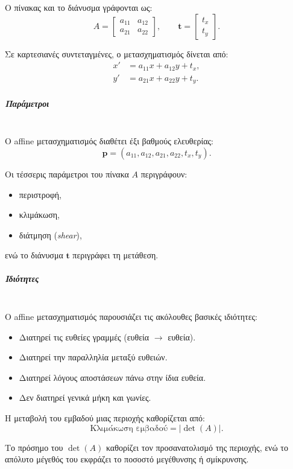 \documentclass[12pt]{article}
\begin{document}
Ο πίνακας και το διάνυσμα γράφονται ως:
\[
A =
\begin{bmatrix}
a_{11} & a_{12} \\
a_{21} & a_{22}
\end{bmatrix},
\qquad
\mathbf{t} =
\begin{bmatrix}
t_x \\
t_y
\end{bmatrix}.
\]

Σε καρτεσιανές συντεταγμένες, ο μετασχηματισμός δίνεται από:
\[
\begin{aligned}
x' &= a_{11}x + a_{12}y + t_x, \\
y' &= a_{21}x + a_{22}y + t_y.
\end{aligned}
\]

\subparagraph{Παράμετροι}
\mbox{}\\
Ο affine μετασχηματισμός διαθέτει έξι βαθμούς ελευθερίας:
\[
\mathbf{p} = (a_{11}, a_{12}, a_{21}, a_{22}, t_x, t_y).
\]

Οι τέσσερις παράμετροι του πίνακα \(A\) περιγράφουν:
\begin{itemize}
    \item περιστροφή,
    \item κλιμάκωση,
    \item διάτμηση (\textit{shear}),
\end{itemize}
ενώ το διάνυσμα \(\mathbf{t}\) περιγράφει τη μετάθεση.

\subparagraph{Ιδιότητες}
\mbox{}\\
Ο affine μετασχηματισμός παρουσιάζει τις ακόλουθες βασικές ιδιότητες:
\begin{itemize}
    \item Διατηρεί τις ευθείες γραμμές (ευθεία \(\rightarrow\) ευθεία).
    \item Διατηρεί την παραλληλία μεταξύ ευθειών.
    \item Διατηρεί λόγους αποστάσεων πάνω στην ίδια ευθεία.
    \item Δεν διατηρεί γενικά μήκη και γωνίες.
\end{itemize}

Η μεταβολή του εμβαδού μιας περιοχής καθορίζεται από:
\[
\text{Κλιμάκωση εμβαδού} = \left| \det(A) \right|.
\]

Το πρόσημο του \(\det(A)\) καθορίζει τον προσανατολισμό της περιοχής, ενώ το απόλυτο μέγεθός του εκφράζει το ποσοστό μεγέθυνσης ή σμίκρυνσης.
\end{document}
